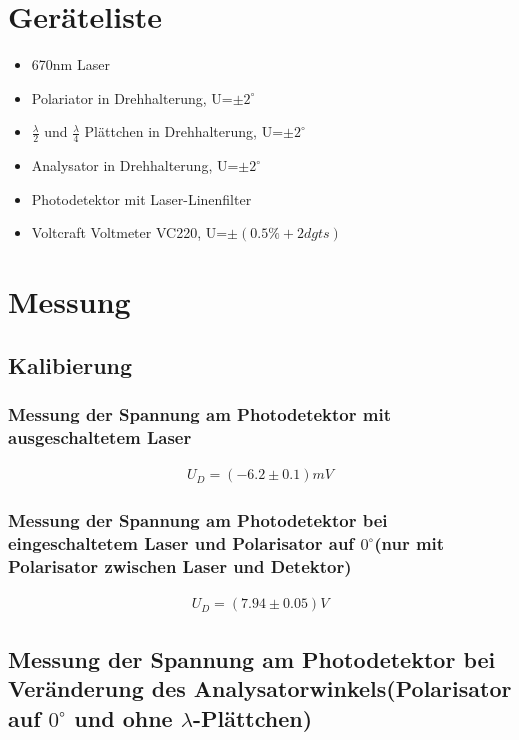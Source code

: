 \documentclass[a4paper]{article}
\begin{document}
\section{Geräteliste}
\begin{itemize}
  \item 670nm Laser
  \item Polariator in Drehhalterung, U=$\pm 2^\circ$
  \item $\frac{\lambda}{2}$ und $\frac{\lambda}{4}$ Plättchen in Drehhalterung, U=$\pm 2^\circ$
  \item Analysator in Drehhalterung, U=$\pm 2^\circ$
  \item Photodetektor mit Laser-Linenfilter
  \item Voltcraft Voltmeter VC220, U=$\pm(0.5\% + 2 dgts)$
\end{itemize}

\section{Messung}
\subsection{Kalibierung}
  \subsubsection{Messung der Spannung am Photodetektor mit ausgeschaltetem Laser}
  \begin{align}
    U_D=(-6.2 \pm 0.1)mV
  \end{align}
  
  \subsubsection{Messung der Spannung am Photodetektor bei eingeschaltetem Laser und Polarisator auf $0^\circ$(nur mit Polarisator zwischen Laser und Detektor)}
  \begin{align}
    U_D=(7.94 \pm 0.05)V
  \end{align}
\newpage
\subsection{Messung der Spannung am Photodetektor bei Veränderung des Analysatorwinkels(Polarisator auf $0^\circ$ und ohne $\lambda$-Plättchen)}
\end{document}
